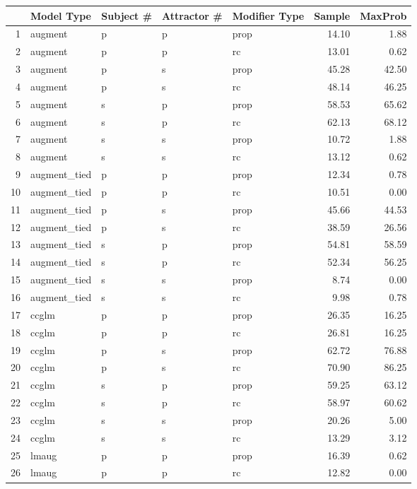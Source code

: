 \begin{tabular}{rllllrr}
  \hline
 & Model Type & Subject \# & Attractor \# & Modifier Type & Sample & MaxProb \\ 
  \hline
1 & augment & p & p & prop & 14.10 & 1.88 \\ 
  2 & augment & p & p & rc & 13.01 & 0.62 \\ 
  3 & augment & p & s & prop & 45.28 & 42.50 \\ 
  4 & augment & p & s & rc & 48.14 & 46.25 \\ 
  5 & augment & s & p & prop & 58.53 & 65.62 \\ 
  6 & augment & s & p & rc & 62.13 & 68.12 \\ 
  7 & augment & s & s & prop & 10.72 & 1.88 \\ 
  8 & augment & s & s & rc & 13.12 & 0.62 \\ 
  9 & augment\_tied & p & p & prop & 12.34 & 0.78 \\ 
  10 & augment\_tied & p & p & rc & 10.51 & 0.00 \\ 
  11 & augment\_tied & p & s & prop & 45.66 & 44.53 \\ 
  12 & augment\_tied & p & s & rc & 38.59 & 26.56 \\ 
  13 & augment\_tied & s & p & prop & 54.81 & 58.59 \\ 
  14 & augment\_tied & s & p & rc & 52.34 & 56.25 \\ 
  15 & augment\_tied & s & s & prop & 8.74 & 0.00 \\ 
  16 & augment\_tied & s & s & rc & 9.98 & 0.78 \\ 
  17 & ccglm & p & p & prop & 26.35 & 16.25 \\ 
  18 & ccglm & p & p & rc & 26.81 & 16.25 \\ 
  19 & ccglm & p & s & prop & 62.72 & 76.88 \\ 
  20 & ccglm & p & s & rc & 70.90 & 86.25 \\ 
  21 & ccglm & s & p & prop & 59.25 & 63.12 \\ 
  22 & ccglm & s & p & rc & 58.97 & 60.62 \\ 
  23 & ccglm & s & s & prop & 20.26 & 5.00 \\ 
  24 & ccglm & s & s & rc & 13.29 & 3.12 \\ 
  25 & lmaug & p & p & prop & 16.39 & 0.62 \\ 
  26 & lmaug & p & p & rc & 12.82 & 0.00 \\ 

\end{tabular}
